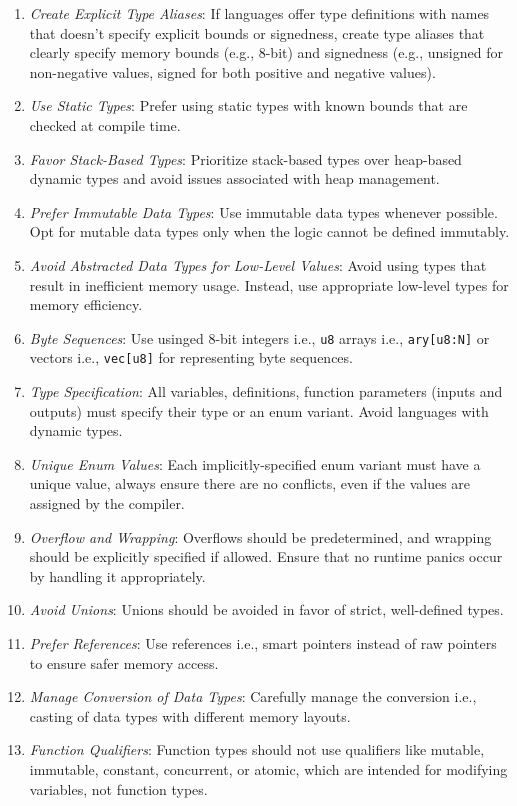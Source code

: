 \documentclass[9pt]{IEEEtran} %
\begin{document}
\begin{enumerate}
  \item \textit{Create Explicit Type Aliases}: If languages offer type definitions with names that doesn't specify explicit bounds or signedness, create type aliases that clearly specify memory bounds (e.g., 8-bit) and signedness (e.g., unsigned for non-negative values, signed for both positive and negative values).
  \item \textit{Use Static Types}: Prefer using static types with known bounds that are checked at compile time. 
  \item \textit{Favor Stack-Based Types}: Prioritize stack-based types over heap-based dynamic types and avoid issues associated with heap management.
  \item \textit{Prefer Immutable Data Types}: Use immutable data types whenever possible. Opt for mutable data types only when the logic cannot be defined immutably.
  \item \textit{Avoid Abstracted Data Types for Low-Level Values}: Avoid using types that result in inefficient memory usage. Instead, use appropriate low-level types for memory efficiency.
  \item \textit{Byte Sequences}: Use usinged 8-bit integers i.e., \texttt{u8} arrays i.e., \texttt{ary[u8:N]} or vectors i.e., \texttt{vec[u8]} for representing byte sequences.
  \item \textit{Type Specification}: All variables, definitions, function parameters (inputs and outputs) must specify their type or an enum variant. Avoid languages with dynamic types.
  \item \textit{Unique Enum Values}: Each implicitly-specified enum variant must have a unique value, always ensure there are no conflicts, even if the values are assigned by the compiler.
  \item \textit{Overflow and Wrapping}: Overflows should be predetermined, and wrapping should be explicitly specified if allowed. Ensure that no runtime panics occur by handling it appropriately.
  \item \textit{Avoid Unions}: Unions should be avoided in favor of strict, well-defined types.
  \item \textit{Prefer References}: Use references i.e., smart pointers instead of raw pointers to ensure safer memory access.
  \item \textit{Manage Conversion of Data Types}: Carefully manage the conversion i.e., casting of data types with different memory layouts.
  \item \textit{Function Qualifiers}: Function types should not use qualifiers like mutable, immutable, constant, concurrent, or atomic, which are intended for modifying variables, not function types.

\end{enumerate}
\end{document}
